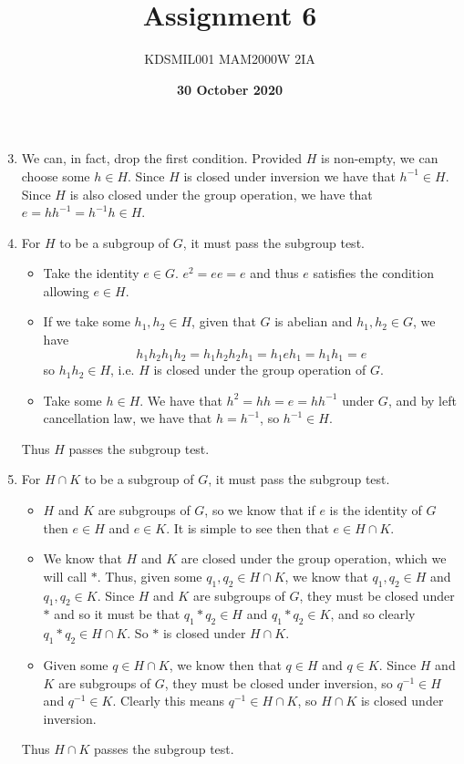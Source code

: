 \documentclass[12pt]{article}
\title{Assignment 6}
\author{KDSMIL001 \; MAM2000W 2IA}
\date{\textbf{30 October 2020}}
\numberwithin{equation}{section}
\numberwithin{figure}{section}
\begin{document}
    \maketitle
    \begin{enumerate}
        \setcounter{enumi}{2}
        \item We can, in fact, drop the first condition. Provided $H$ is non-empty, we can choose some $h\in H$. 
        Since $H$ is closed under inversion we have that $h^{-1}\in H$. Since $H$ is also closed under the group operation, 
        we have that $e=hh^{-1}=h^{-1}h\in H$.

        \item For $H$ to be a subgroup of $G$, it must pass the subgroup test.
        \begin{itemize}
            \item Take the identity $e\in G$. $e^2=ee=e$ and thus $e$ satisfies the condition allowing $e\in H$. 
            \item If we take some $h_1, h_2\in H$, given that $G$ is abelian and $h_1,h_2\in G$, we have 
            \begin{equation}
                h_1h_2h_1h_2=h_1h_2h_2h_1=h_1eh_1=h_1h_1=e
            \end{equation}
            so $h_1h_2\in H$, i.e. $H$ is closed under the group operation of $G$.
            \item Take some $h\in H$. We have that $h^2=hh=e=hh^{-1}$ under $G$, and by left cancellation law, we have that $h=h^{-1}$, 
            so $h^{-1}\in H$.
        \end{itemize}
        Thus $H$ passes the subgroup test. 

        \item For $H\cap K$ to be a subgroup of $G$, it must pass the subgroup test.
        \begin{itemize}
            \item $H$ and $K$ are subgroups of $G$, so we know that if $e$ is the identity of $G$ then $e\in H$ and $e\in K$. 
            It is simple to see then that $e\in H\cap K$.
            \item We know that $H$ and $K$ are closed under the group operation, which we will call $*$. Thus, given some 
            $q_1,q_2\in H\cap K$, we know that $q_1,q_2\in H$ and $q_1,q_2\in K$. Since $H$ and $K$ are subgroups of $G$, they must be closed under $*$ and so it 
            must be that $q_1*q_2\in H$ and $q_1*q_2\in K$, and so clearly $q_1*q_2\in H\cap K$. So $*$ is closed under $H\cap K$. 
            \item Given some $q\in H\cap K$, we know then that $q\in H$ and $q\in K$. Since $H$ and $K$ are subgroups of $G$, they 
            must be closed under inversion, so $q^{-1}\in H$ and $q^{-1}\in K$. Clearly this means $q^{-1}\in H\cap K$, so $H\cap K$ is closed under inversion.
        \end{itemize}
        Thus $H\cap K$ passes the subgroup test. 
    \end{enumerate}
\end{document}
